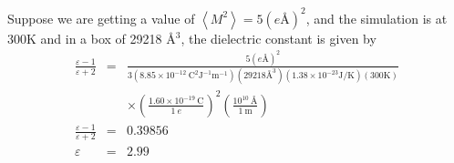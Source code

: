 \documentclass[aps, 12pt, amsmath, amssymb, onecolumn, notitlepage, nofootinbib]{revtex4-1}
\begin{document}
Suppose we are getting a value of $\left\langle M^2 \right\rangle = 5 (e\text{\AA})^2$, and the simulation is at 300K and in a box of 29218 \AA$^3$, the dielectric constant is given by
\begin{eqnarray}
\frac{\varepsilon-1}{\varepsilon+2} &=& \frac{ 5 (e\text{\AA})^2}{3  \left( 8.85 \times 10^{-12}\ \text{C}^2 \text{J}^{-1} \text{m}^{-1} \right) \left( 29218 \text{\AA}^3 \right) (1.38 
\times 10^{-23} \text{J/K}) (300 \text{K})  }\nonumber\\
&& \times\left( \frac{ 1.60 \times 10^{-19}\ \text{C} }{1\ e}\right)^2 \left( \frac{10^{10}\ \text{\AA}}{1\ \text{m}} \right)\nonumber\\
\frac{\varepsilon-1}{\varepsilon+2} &=& 0.39856\nonumber\\
\varepsilon &=& 2.99
\end{eqnarray}




\end{document}

